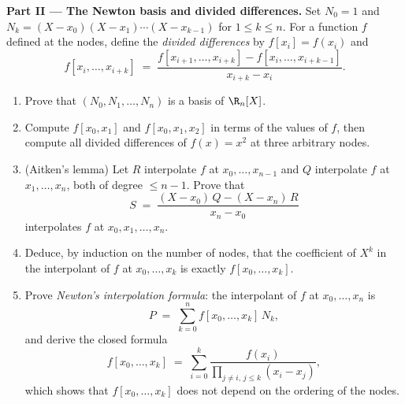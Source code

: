 \begin{problem}
\medskip
\noindent\textbf{Part II --- The Newton basis and divided
differences.} Set $N_0 = 1$ and $N_k = (X - x_0)(X - x_1) \cdots
(X - x_{k-1})$ for $1 \leq k \leq n$. For a function $f$ defined
at the nodes, define the \emph{divided differences} by
$f[x_i] = f(x_i)$ and
\[
f[x_i, \dots, x_{i+k}] \;=\;
\frac{f[x_{i+1}, \dots, x_{i+k}] - f[x_i, \dots, x_{i+k-1}]}
{x_{i+k} - x_i} .
\]
\begin{enumerate}[resume]
  \item Prove that $(N_0, N_1, \dots, N_n)$ is a basis of
        $\R_n[X]$.
  \item Compute $f[x_0, x_1]$ and $f[x_0, x_1, x_2]$ in terms of
        the values of $f$, then compute all divided differences of
        $f(x) = x^2$ at three arbitrary nodes.
  \item (Aitken's lemma) Let $R$ interpolate $f$ at $x_0, \dots,
        x_{n-1}$ and $Q$ interpolate $f$ at $x_1, \dots, x_n$,
        both of degree $\leq n - 1$. Prove that
        \[
        S \;=\; \frac{(X - x_0)\,Q - (X - x_n)\,R}{x_n - x_0}
        \]
        interpolates $f$ at $x_0, x_1, \dots, x_n$.
  \item Deduce, by induction on the number of nodes, that the
        coefficient of $X^{k}$ in the interpolant of $f$ at $x_0,
        \dots, x_k$ is exactly $f[x_0, \dots, x_k]$.
  \item Prove \emph{Newton's interpolation formula}: the
        interpolant of $f$ at $x_0, \dots, x_n$ is
        \[
        P \;=\; \sum_{k=0}^{n} f[x_0, \dots, x_k]\, N_k ,
        \]
        and derive the closed formula
        \[
        f[x_0, \dots, x_k] \;=\; \sum_{i=0}^{k}
        \frac{f(x_i)}{\prod_{j \neq i,\, j \leq k} (x_i - x_j)} ,
        \]
        which shows that $f[x_0, \dots, x_k]$ does not depend on
        the ordering of the nodes.
\end{enumerate}


\end{problem}
